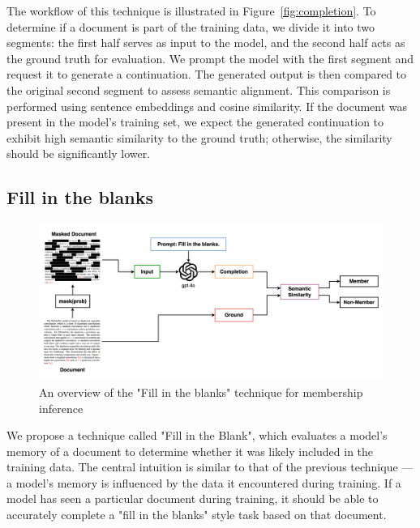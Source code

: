 \documentclass[sigconf]{acmart}
\begin{document}
The workflow of this technique is illustrated in Figure~\ref{fig:completion}.  To determine if a document is part of the training data, we divide it into two segments: the first half serves as input to the model, and the second half acts as the ground truth for evaluation. We prompt the model with the first segment and request it to generate a continuation. The generated output is then compared to the original second segment to assess semantic alignment. This comparison is performed using sentence embeddings and cosine similarity. If the document was present in the model’s training set, we expect the generated continuation to exhibit high semantic similarity to the ground truth; otherwise, the similarity should be significantly lower.

\subsection{Fill in the blanks}

\begin{figure}[htp]
  \centering
  \includegraphics[width=\textwidth]{figures/masking.drawio.png}
    \caption{An overview of the "Fill in the blanks" technique for membership inference}
    \label{fig:fill-in-the-blanks}
\end{figure}

We propose a technique called "Fill in the Blank", which evaluates a model’s memory of a document to determine whether it was likely included in the training data. The central intuition is similar to that of the previous technique — a model’s memory is influenced by the data it encountered during training. If a model has seen a particular document during training, it should be able to accurately complete a "fill in the blanks" style task based on that document. 
\end{document}
